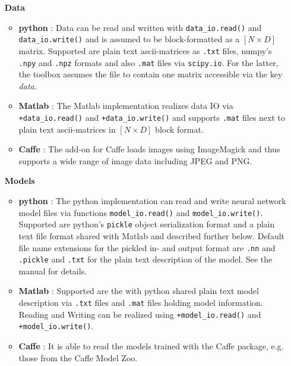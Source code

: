 \documentclass[a4wide]{article}
\begin{document}
\begin{itemize}
\item[{\textbf{Data}}]
	\begin{itemize}
		\item \textbf{python} : Data can be read and written with \texttt{data\_io.read()} and \texttt{data\_io.write()} and is assumed to be block-formatted as a $[N \times D]$ matrix. Supported are plain text ascii-matrices as \texttt{.txt} files, numpy's \texttt{.npy} and \texttt{.npz} formats and also \texttt{.mat} files via \texttt{scipy.io}. For the latter, the toolbox assumes the file to contain one matrix accessible via the key \emph{data}.
		\item \textbf{Matlab} : The Matlab implementation realizes data IO via \texttt{+data\_io.read()} and \texttt{+data\_io.write()} and supports \texttt{.mat} files next to plain text ascii-matrices in $[N \times D]$ block format.
		\item \textbf{Caffe} : The add-on for Caffe loads images using ImageMagick and thus supports a wide range of image data including JPEG and PNG.
	\end{itemize}
\item[{\textbf{Models}}]
	\begin{itemize}
		\item \textbf{python} : The python implementation can read and write neural network model files via functions \texttt{model\_io.read()} and \texttt{model\_io.write()}. Supported are python's \texttt{pickle} object serialization format and a plain text file format shared with Matlab and described further below. Default file name extensions for the pickled in- and output format are \texttt{.nn} and \texttt{.pickle} and \texttt{.txt} for the plain text description of the model. See the manual for details.
		\item \textbf{Matlab} : Supported are the with python shared plain text model description via \texttt{.txt} files and \texttt{.mat} files holding model information. Reading and Writing can be realized using \texttt{+model\_io.read()} and \texttt{+model\_io.write()}.
		
		\item \textbf{Caffe} : It is able to read the models trained with the Caffe package, e.g. those from the Caffe Model Zoo.
		\end{itemize}		
		

\end{itemize}
\end{document}
